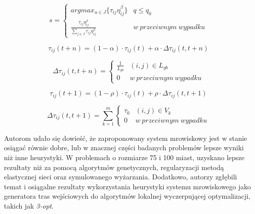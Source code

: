 {{{            \begin{equation}\label{eqt:ant_colony_dispatch}
                s = \left\{
                        \begin{matrix}
                            argmax_{u \in J} \{\tau_{ij}\eta_{ij}^\beta\} & q \leq q_0\\
                            \frac{\tau_{ij} \eta_{ij}^\beta}{\sum_{j\in J} {\tau_{ij} \eta_{ij}^\beta} } & w\ przeciwnym\ wypadku
                        \end{matrix}
                    \right.
            \end{equation}

            \begin{equation}\label{eqt:ant_colony_global_update_1}
                \tau_{ij}(t + n) = (1 - \alpha) \cdot \tau_{ij}(t) + \alpha \cdot \Delta\tau_{ij}(t, t + n)
            \end{equation}

            \begin{equation}\label{eqt:ant_colony_global_update_2}
                \Delta\tau_{ij}(t, t + n) = \left\{
                    \begin{matrix}
                        \frac{1}{L_{gb}} & (i, j) \in L_{gb} \\
                        0 & w\ przeciwnym\ wypadku
                    \end{matrix}
                \right.
            \end{equation}

            \begin{equation}\label{eqt:ant_colony_local_update_1}
                \tau_{ij}(t + 1) = (1 - \rho) \cdot \tau_{ij}(t) + \rho \cdot \Delta\tau_{ij}(t, t + 1)
            \end{equation}

            \begin{equation}\label{eqt:ant_colony_local_update_2}
                \Delta\tau_{ij}(t, t + 1) = \sum_{k=1}^m \left\{
                    \begin{matrix}
                        \tau_0 & (i, j) \in V_k \\
                        0 & w\ przeciwnym\ wypadku
                    \end{matrix}
                \right.
            \end{equation}

            Autorom udało się dowieść, że zaproponowany system mrowiskowy jest w stanie osiągać równie dobre, lub w
            znacznej części badanych problemów lepsze wyniki niż inne heurystyki. W problemach o rozmiarze 75 i 100
            miast, uzyskano lepsze rezultaty niż za pomocą algorytmów genetycznych, regularyzacji metodą elastycznej
            sieci oraz symulowanego wyżarzania. Dodatkowo, autorzy zgłębili temat i osiągalne rezultaty wykorzystania
            heurystyki systemu mrowiskowego jako generatora tras wejściowych do algorytmów lokalnej wyczerpującej
            optymalizacji, takich jak \textit{3-opt}.
        }

}}
